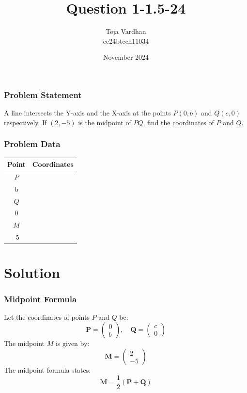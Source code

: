 \documentclass{beamer}
\title{Question 1-1.5-24}
\author{Teja Vardhan \\ ee24btech11034 }
\date{November 2024}
\begin{document}
\begin{frame}
\titlepage
\end{frame}

\begin{frame}
\frametitle{Problem Statement}
A line intersects the Y-axis and the X-axis at the points \( P(0, b) \) and \( Q(c, 0) \) respectively. If \( (2, -5) \) is the midpoint of \( PQ \), find the coordinates of \( P \) and \( Q \).
\end{frame}

\begin{frame}
\frametitle{Problem Data}
\begin{table}[h]
\centering
\begin{tabular}{|c|c|}
\hline
\textbf{Point} & \textbf{Coordinates} \\ \hline
\( P \) & \( \begin{pmatrix} 0 \\ b \end{pmatrix} \) \\ \hline
\( Q \) & \( \begin{pmatrix} c \\ 0 \end{pmatrix} \) \\ \hline
\( M \) & \( \begin{pmatrix} 2 \\ -5 \end{pmatrix} \) \\ \hline
\end{tabular}
\end{table}
\end{frame}

\section{Solution}
\begin{frame}
\frametitle{Midpoint Formula}
Let the coordinates of points \( P \) and \( Q \) be:
\[
\mathbf{P} = \begin{pmatrix} 0 \\ b \end{pmatrix}, \quad \mathbf{Q} = \begin{pmatrix} c \\ 0 \end{pmatrix}
\]
The midpoint \( M \) is given by:
\[
\mathbf{M} = \begin{pmatrix} 2 \\ -5 \end{pmatrix}
\]
The midpoint formula states:
\[
\mathbf{M} = \frac{1}{2} (\mathbf{P} + \mathbf{Q})
\]
\end{frame}
\end{document}
